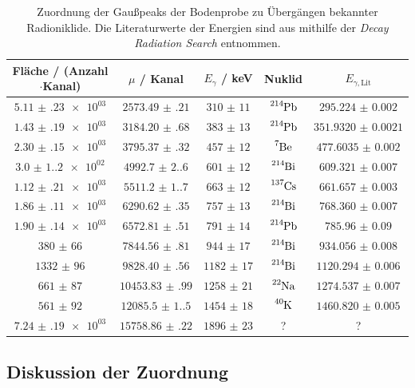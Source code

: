\begin{table}[h]
\centering
\begin{tabular}{|c|c|c||c c|} \hline
Fläche / (Anzahl$\cdot$Kanal) & $\mu$ / Kanal & $E_\gamma$ / keV & Nuklid & $E_{\gamma,\text{Lit}}$ \\ \hline
$\num{5.11(23)e+03}$ & $\num{2573.49(21)}$ & $\num{310(11)}$ & $\ce{^214Pb}$ & $\num{295.224(2)}$ \\
$\num{1.43(19)e+03}$& $\num{3184.20(68)}$ & $\num{383(13)}$ & $\ce{^214Pb}$ & $\num{351.9320(21)}$ \\
$\num{2.30(15)e+03}$& $\num{3795.37(32)}$ & $\num{457(12)}$ & $\ce{^7Be}$ & $\num{477.6035(20)}$ \\
$\num{3.0(1.2)e+02}$ & $\num{4992.7(2.6)}$ & $\num{601(12)}$ & $\ce{^214Bi}$ & $\num{609.321(7)}$ \\
$\num{1.12(21)e+03}$ & $\num{5511.2(1.7)}$ & $\num{663(12)}$ & $\ce{^137Cs}$ & $\num{661.657(3)}$ \\
$\num{1.86(11)e+03}$ & $\num{6290.62(35)}$ & $\num{757(13)}$ & $\ce{^214Bi}$ & $\num{768.360(7)}$ \\
$\num{1.90(14)e+03}$& $\num{6572.81(51)}$ & $\num{791(14)}$ & $\ce{^214Pb}$ & $\num{785.96(9)}$ \\
$\num{380(66)}$ & $\num{7844.56(81)}$ & $\num{944(17)}$ & $\ce{^214Bi}$ & $\num{934.056(8)}$ \\
$\num{1332(96)}$ & $\num{9828.40(56)}$& $\num{1182(17)}$ & $\ce{^214Bi}$ & $\num{1120.294(6)}$ \\
$\num{661(87)}$& $\num{10453.83(99)}$& $\num{1258(21)}$ & $\ce{^22Na}$ & $\num{1274.537(7)}$ \\
$\num{561(92)}$& $\num{12085.5(1.5)}$& $\num{1454(18)}$ & $\ce{^40K}$ & $\num{1460.820(5)}$ \\
$\num{7.24(19)e+03}$& $\num{15758.86(22)}$& $\num{1896(23)}$ & ? & ? \\
\hline
\end{tabular}
\caption{Zuordnung der Gaußpeaks der Bodenprobe zu Übergängen bekannter Radioniklide. Die Literaturwerte der Energien sind aus \cite{nudat} mithilfe der \textit{Decay Radiation Search} entnommen.}
\label{tab:bodenprobe_zuordnung}
\end{table}

\subsection{Diskussion der Zuordnung}

